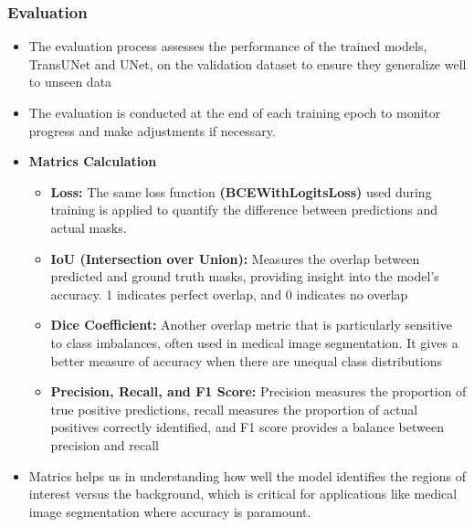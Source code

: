 \documentclass[11pt,a4paper]{article}
\begin{document}
\subsubsection{Evaluation}

\begin{itemize}
    \item The evaluation process assesses the performance of the trained models, TransUNet and UNet, on the validation dataset to ensure they generalize well to unseen data
    \item The evaluation is conducted at the end of each training epoch to monitor progress and make adjustments if necessary.
    \item \textbf{Matrics Calculation}
    \begin{itemize}
        \item \textbf{Loss:} The same loss function \textbf{(BCEWithLogitsLoss)} used during training is applied to quantify the difference between predictions and actual masks.
        \item \textbf{IoU (Intersection over Union):} Measures the overlap between predicted and ground truth masks, providing insight into the model's accuracy. 1 indicates perfect overlap, and 0 indicates no overlap
        \item \textbf{Dice Coefficient:} Another overlap metric that is particularly sensitive to class imbalances, often used in medical image segmentation. It gives a better measure of accuracy when there are unequal class distributions
        \item \textbf{Precision, Recall, and F1 Score:} Precision measures the proportion of true positive predictions, recall measures the proportion of actual positives correctly identified, and F1 score provides a balance between precision and recall
        
    \end{itemize}
    \item Matrics helps us in understanding how well the model identifies the regions of interest versus the background, which is critical for applications like medical image segmentation where accuracy is paramount.

\end{itemize}
\end{document}
